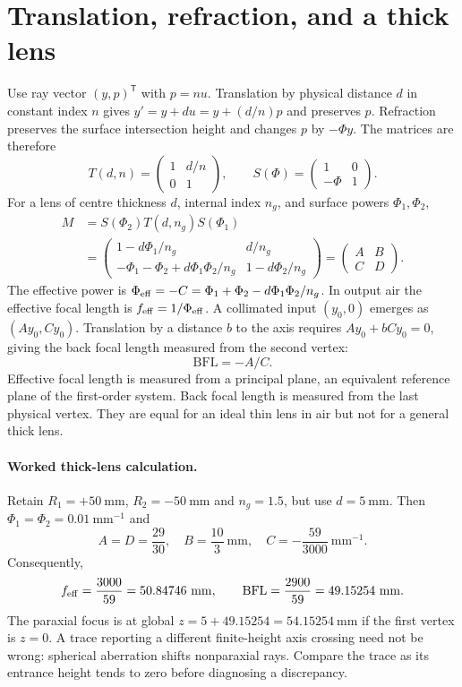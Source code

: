 \section{Translation, refraction, and a thick lens}
Use ray vector $(y,p)^{\mathsf T}$ with $p=nu$. Translation by physical distance $d$ in constant index $n$ gives $y'=y+du=y+(d/n)p$ and preserves $p$. Refraction preserves the surface intersection height and changes $p$ by $-\Phi y$. The matrices are therefore
\begin{equation}
T(d,n)=\begin{pmatrix}1&d/n\\0&1\end{pmatrix},\qquad
S(\Phi)=\begin{pmatrix}1&0\\-\Phi&1\end{pmatrix}.
\label{fnd:matrices}
\end{equation}
For a lens of centre thickness $d$, internal index $n_g$, and surface powers $\Phi_1,\Phi_2$,
\begin{align}
M&=S(\Phi_2)T(d,n_g)S(\Phi_1)\\
&=\begin{pmatrix}
1-d\Phi_1/n_g&d/n_g\\
-\Phi_1-\Phi_2+d\Phi_1\Phi_2/n_g&1-d\Phi_2/n_g
\end{pmatrix}
=\begin{pmatrix}A&B\\C&D\end{pmatrix}.
\end{align}
The effective power is $\Phi_{\rm eff}=-C=\Phi_1+\Phi_2-d\Phi_1\Phi_2/n_g$. In output air the effective focal length is $f_{\rm eff}=1/\Phi_{\rm eff}$. A collimated input $(y_0,0)$ emerges as $(Ay_0,Cy_0)$. Translation by a distance $b$ to the axis requires $Ay_0+bCy_0=0$, giving the back focal length measured from the second vertex:
\begin{equation}
\boxed{\mathrm{BFL}=-A/C.}
\label{fnd:bfl}
\end{equation}
Effective focal length is measured from a principal plane, an equivalent reference plane of the first-order system. Back focal length is measured from the last physical vertex. They are equal for an ideal thin lens in air but not for a general thick lens.

\paragraph{Worked thick-lens calculation.}
Retain $R_1=+50\ \mathrm{mm}$, $R_2=-50\ \mathrm{mm}$ and $n_g=1.5$, but use $d=5\ \mathrm{mm}$. Then $\Phi_1=\Phi_2=0.01\ \mathrm{mm}^{-1}$ and
\[
A=D=\frac{29}{30},\quad B=\frac{10}{3}\ \mathrm{mm},\quad
C=-\frac{59}{3000}\ \mathrm{mm}^{-1}.
\]
Consequently,
\[
f_{\rm eff}=\frac{3000}{59}=50.84746\ \mathrm{mm},\qquad
\mathrm{BFL}=\frac{2900}{59}=49.15254\ \mathrm{mm}.
\]
The paraxial focus is at global $z=5+49.15254=54.15254\ \mathrm{mm}$ if the first vertex is $z=0$. A trace reporting a different finite-height axis crossing need not be wrong: spherical aberration shifts nonparaxial rays. Compare the trace as its entrance height tends to zero before diagnosing a discrepancy.

